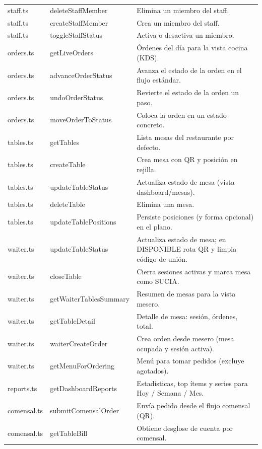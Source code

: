 \begin{longtable}{>{\ttfamily\raggedright\arraybackslash}p{4cm}
                >{\ttfamily\raggedright\arraybackslash}p{4cm}
                >{\raggedright\arraybackslash}p{8cm}}
staff.ts & deleteStaffMember & Elimina un miembro del staff. \\
\rowcolor{altrow}
staff.ts & createStaffMember & Crea un miembro del staff. \\
staff.ts & toggleStaffStatus & Activa o desactiva un miembro. \\
\rowcolor{altrow}
orders.ts & getLiveOrders & Órdenes del día para la vista cocina (KDS). \\
orders.ts & advanceOrderStatus & Avanza el estado de la orden en el flujo estándar. \\
\rowcolor{altrow}
orders.ts & undoOrderStatus & Revierte el estado de la orden un paso. \\
orders.ts & moveOrderToStatus & Coloca la orden en un estado concreto. \\
\rowcolor{altrow}
tables.ts & getTables & Lista mesas del restaurante por defecto. \\
tables.ts & createTable & Crea mesa con QR y posición en rejilla. \\
\rowcolor{altrow}
tables.ts & updateTableStatus & Actualiza estado de mesa (vista dashboard/mesas). \\
tables.ts & deleteTable & Elimina una mesa. \\
\rowcolor{altrow}
tables.ts & updateTablePositions & Persiste posiciones (y forma opcional) en el plano. \\
waiter.ts & updateTableStatus & Actualiza estado de mesa; en DISPONIBLE rota QR y limpia código de unión. \\
\rowcolor{altrow}
waiter.ts & closeTable & Cierra sesiones activas y marca mesa como SUCIA. \\
waiter.ts & getWaiterTablesSummary & Resumen de mesas para la vista mesero. \\
\rowcolor{altrow}
waiter.ts & getTableDetail & Detalle de mesa: sesión, órdenes, total. \\
waiter.ts & waiterCreateOrder & Crea orden desde mesero (mesa ocupada y sesión activa). \\
\rowcolor{altrow}
waiter.ts & getMenuForOrdering & Menú para tomar pedidos (excluye agotados). \\
reports.ts & getDashboardReports & Estadísticas, top ítems y series para Hoy / Semana / Mes. \\
\rowcolor{altrow}
comensal.ts & submitComensalOrder & Envía pedido desde el flujo comensal (QR). \\
comensal.ts & getTableBill & Obtiene desglose de cuenta por comensal. \\

\end{longtable}
